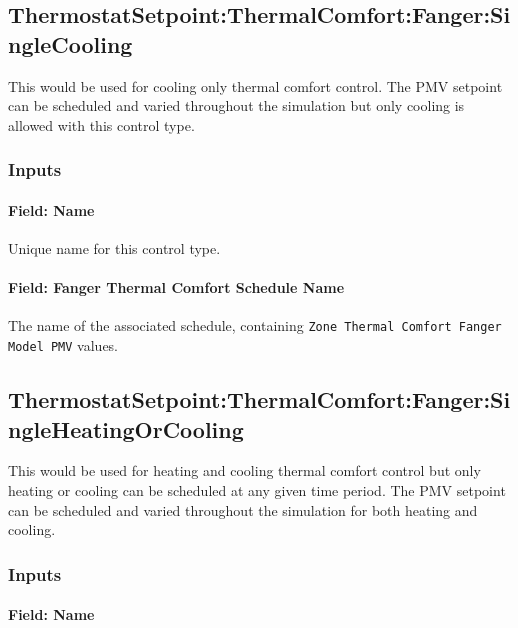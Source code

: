 \subsection{ThermostatSetpoint:ThermalComfort:Fanger:SingleCooling}\label{thermostatsetpointthermalcomfortfangersinglecooling}

This would be used for cooling only thermal comfort control. The PMV setpoint can be scheduled and varied throughout the simulation but only cooling is allowed with this control type.

\subsubsection{Inputs}\label{inputs-11-022}

\paragraph{Field: Name}\label{field-name-9-021}

Unique name for this control type.

\paragraph{Field: Fanger Thermal Comfort Schedule Name}\label{field-fanger-thermal-comfort-schedule-name-1}

The name of the associated schedule, containing \lstinline!Zone Thermal Comfort Fanger Model PMV! values.

\subsection{ThermostatSetpoint:ThermalComfort:Fanger:SingleHeatingOrCooling}\label{thermostatsetpointthermalcomfortfangersingleheatingorcooling}

This would be used for heating and cooling thermal comfort control but only heating or cooling can be scheduled at any given time period. The PMV setpoint can be scheduled and varied throughout the simulation for both heating and cooling.

\subsubsection{Inputs}\label{inputs-12-020}

\paragraph{Field: Name}\label{field-name-10-019}

